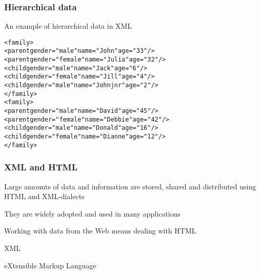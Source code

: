 \documentclass[12pt]{beamer}\usepackage[]{graphicx}\usepackage[]{color}
\makeatletter
\newcommand{\hlstr}[1]{\textcolor[rgb]{0.192,0.494,0.8}{#1}}%
\newenvironment{kframe}{%
 \def\at@end@of@kframe{}%
 \ifinner\ifhmode%
  \def\at@end@of@kframe{\end{minipage}}%
  \begin{minipage}{\columnwidth}%
 \fi\fi%
 \def\FrameCommand##1{\hskip\@totalleftmargin \hskip-\fboxsep
 \colorbox{shadecolor}{##1}\hskip-\fboxsep
     \hskip-\linewidth \hskip-\@totalleftmargin \hskip\columnwidth}%
 \MakeFramed {\advance\hsize-\width
   \@totalleftmargin\z@ \linewidth\hsize
   \@setminipage}}%
 {\par\unskip\endMakeFramed%
 \at@end@of@kframe}
\newenvironment{knitrout}{}{} %
\makeatother
\begin{document}
\begin{frame}[fragile]
\frametitle{Hierarchical data}

An example of hierarchical data in XML
\begin{knitrout}\footnotesize
{}\color{fgcolor}\begin{kframe}
\begin{alltt}
<family>
  <parent gender=\hlstr{"male"} name=\hlstr{"John"} age=\hlstr{"33"} />
  <parent gender=\hlstr{"female"} name=\hlstr{"Julia"} age=\hlstr{"32"} />
  <child gender=\hlstr{"male"} name=\hlstr{"Jack"} age=\hlstr{"6"} />
  <child gender=\hlstr{"female"} name=\hlstr{"Jill"} age=\hlstr{"4"} />
  <child gender=\hlstr{"male"} name=\hlstr{"John jnr"} age=\hlstr{"2"} />
</family>
<family>
  <parent gender=\hlstr{"male"} name=\hlstr{"David"} age=\hlstr{"45"} />
  <parent gender=\hlstr{"female"} name=\hlstr{"Debbie"} age=\hlstr{"42"} />
  <child gender=\hlstr{"male"} name=\hlstr{"Donald"} age=\hlstr{"16"} />
  <child gender=\hlstr{"female"} name=\hlstr{"Dianne"} age=\hlstr{"12"} />
</family>
\end{alltt}
\end{kframe}
\end{knitrout}

\end{frame}


\begin{frame}
\frametitle{XML and HTML}

\bbi
  \item Large amounts of data and information are stored, shared and distributed using HTML and XML-dialects
  \item They are widely adopted and used in many applications
  \item Working with data from the Web means dealing with HTML
\ei
\eb

\end{frame}


\begin{frame}
 \begin{center}
  {\Huge \hilit XML}
  
  \bigskip
  {\Large \hilit eXtensible Markup Language}
 \end{center}
\end{frame}
\end{document}
